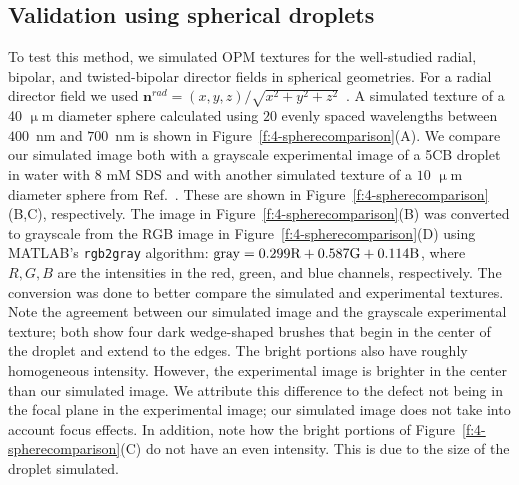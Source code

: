 \subsection{Validation using spherical droplets}
To test this method, we simulated OPM textures for the well-studied radial, bipolar, and twisted-bipolar director fields in spherical geometries.
For a radial director field we used $\mathbf{n}^{rad} = (x,y,z)/\sqrt{x^2+y^2+z^2}$~\cite{RN232}.
A simulated texture of a 40 $\upmu$m diameter sphere calculated using $20$ evenly spaced wavelengths between $400$~nm and $700$~nm is shown in Figure~\ref{f:4-spherecomparison}(A).
We compare our simulated image both with a grayscale experimental image of a 5CB droplet in water with 8 mM SDS and with another simulated texture of a $10$ $\upmu$m diameter sphere from Ref.~\cite{RN310}.
These are shown in Figure~\ref{f:4-spherecomparison}(B,C), respectively.
The image in Figure~\ref{f:4-spherecomparison}(B) was converted to grayscale from the RGB image in Figure~\ref{f:4-spherecomparison}(D) using MATLAB's \texttt{rgb2gray} algorithm: ${\rm gray} = 0.299 \textrm{R} + 0.587 \textrm{G} + 0.114 \textrm{B}$, where $R,G,B$ are the intensities in the red, green, and blue channels, respectively.
The conversion was done to better compare the simulated and experimental textures.
Note the agreement between our simulated image and the grayscale experimental texture; both show four dark wedge-shaped brushes that begin in the center of the droplet and extend to the edges.
The bright portions also have roughly homogeneous intensity.
However, the experimental image is brighter in the center than our simulated image.
We attribute this difference to the defect not being in the focal plane in the experimental image; our simulated image does not take into account focus effects.
In addition, note how the bright portions of Figure~\ref{f:4-spherecomparison}(C) do not have an even intensity.
This is due to the size of the droplet simulated.

